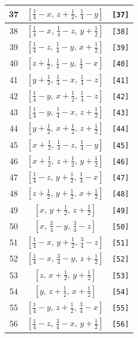 \documentclass[fleqn,8pt]{jsarticle}
\begin{document}
\begin{longtable}{ccc}
37 & $\left[ \frac{1}{4} - x,\, z + \frac{1}{2},\, \frac{1}{4} - y \right]$ & {\tt [37]} \\ \hline
38 & $\left[ \frac{1}{4} - x,\, \frac{1}{4} - z,\, y + \frac{1}{2} \right]$ & {\tt [38]} \\ \hline
39 & $\left[ \frac{1}{4} - z,\, \frac{1}{4} - y,\, x + \frac{1}{2} \right]$ & {\tt [39]} \\ \hline
40 & $\left[ z + \frac{1}{2},\, \frac{1}{4} - y,\, \frac{1}{4} - x \right]$ & {\tt [40]} \\ \hline
41 & $\left[ y + \frac{1}{2},\, \frac{1}{4} - x,\, \frac{1}{4} - z \right]$ & {\tt [41]} \\ \hline
42 & $\left[ \frac{1}{4} - y,\, x + \frac{1}{2},\, \frac{1}{4} - z \right]$ & {\tt [42]} \\ \hline
43 & $\left[ \frac{1}{4} - y,\, \frac{1}{4} - x,\, z + \frac{1}{2} \right]$ & {\tt [43]} \\ \hline
44 & $\left[ y + \frac{1}{2},\, x + \frac{1}{2},\, z + \frac{1}{2} \right]$ & {\tt [44]} \\ \hline
45 & $\left[ x + \frac{1}{2},\, \frac{1}{4} - z,\, \frac{1}{4} - y \right]$ & {\tt [45]} \\ \hline
46 & $\left[ x + \frac{1}{2},\, z + \frac{1}{2},\, y + \frac{1}{2} \right]$ & {\tt [46]} \\ \hline
47 & $\left[ \frac{1}{4} - z,\, y + \frac{1}{2},\, \frac{1}{4} - x \right]$ & {\tt [47]} \\ \hline
48 & $\left[ z + \frac{1}{2},\, y + \frac{1}{2},\, x + \frac{1}{2} \right]$ & {\tt [48]} \\ \hline
49 & $\left[ x,\, y + \frac{1}{2},\, z + \frac{1}{2} \right]$ & {\tt [49]} \\ \hline
50 & $\left[ x,\, \frac{3}{4} - y,\, \frac{3}{4} - z \right]$ & {\tt [50]} \\ \hline
51 & $\left[ \frac{1}{4} - x,\, y + \frac{1}{2},\, \frac{3}{4} - z \right]$ & {\tt [51]} \\ \hline
52 & $\left[ \frac{1}{4} - x,\, \frac{3}{4} - y,\, z + \frac{1}{2} \right]$ & {\tt [52]} \\ \hline
53 & $\left[ z,\, x + \frac{1}{2},\, y + \frac{1}{2} \right]$ & {\tt [53]} \\ \hline
54 & $\left[ y,\, z + \frac{1}{2},\, x + \frac{1}{2} \right]$ & {\tt [54]} \\ \hline
55 & $\left[ \frac{1}{4} - y,\, z + \frac{1}{2},\, \frac{3}{4} - x \right]$ & {\tt [55]} \\ \hline
56 & $\left[ \frac{1}{4} - z,\, \frac{3}{4} - x,\, y + \frac{1}{2} \right]$ & {\tt [56]} \\ \hline

\end{longtable}
\end{document}
